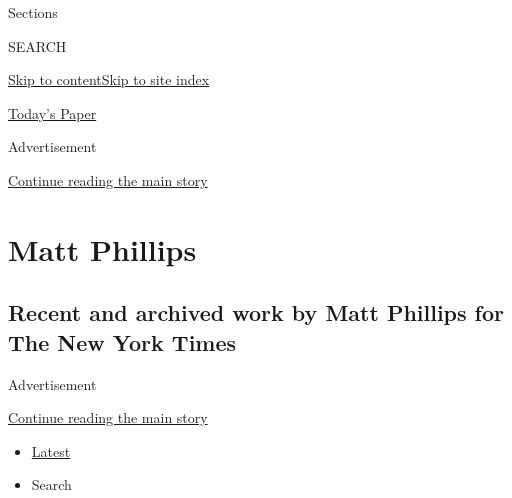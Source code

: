 Sections

SEARCH

\protect\hyperlink{site-content}{Skip to
content}\protect\hyperlink{site-index}{Skip to site index}

\href{https://myaccount.nytimes3xbfgragh.onion/auth/login?response_type=cookie\&client_id=vi}{}

\href{https://www.nytimes3xbfgragh.onion/section/todayspaper}{Today's
Paper}

Advertisement

\protect\hyperlink{after-top}{Continue reading the main story}

\hypertarget{matt-phillips}{%
\section{Matt Phillips}\label{matt-phillips}}

\hypertarget{recent-and-archived-work-by-matt-phillips-for-the-new-york-times}{%
\subsection{Recent and archived work by Matt Phillips for The New York
Times}\label{recent-and-archived-work-by-matt-phillips-for-the-new-york-times}}

Advertisement

\protect\hyperlink{after-mid1}{Continue reading the main story}

\begin{itemize}
\tightlist
\item
  \protect\hyperlink{stream-panel}{Latest}
\item
  Search
\end{itemize}

